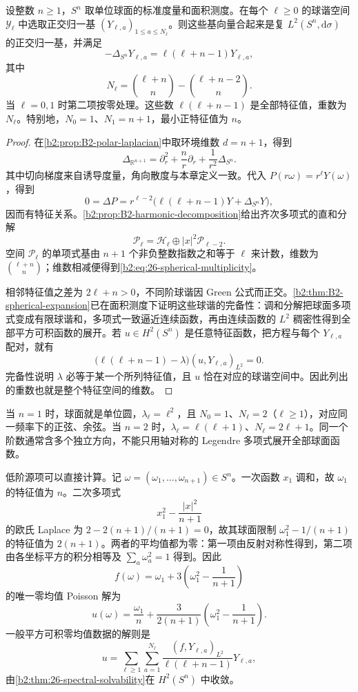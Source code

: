 \begin{proposition}[单位球面的球谐谱]\label{b2:prop:26-sphere-spectrum}
设整数 \(n\geq1\)，\(S^n\) 取单位球面的标准度量和面积测度。在每个 \(\ell\geq0\) 的球谐空间 \(\mathcal Y_\ell\) 中选取正交归一基 \((Y_{\ell,a})_{1\leq a\leq N_\ell}\)。则这些基向量合起来是复 \(L^2(S^n,\mathrm d\sigma)\) 的正交归一基，并满足
\[
 -\Delta_{S^n}Y_{\ell,a}=\ell(\ell+n-1)Y_{\ell,a},
\]
其中
\begin{equation}\label{b2:eq:26-spherical-multiplicity}
 N_\ell=\binom{\ell+n}{n}-\binom{\ell+n-2}{n}.
\end{equation}
当 \(\ell=0,1\) 时第二项按零处理。这些数 \(\ell(\ell+n-1)\) 是全部特征值，重数为 \(N_\ell\)。特别地，\(N_0=1\)、\(N_1=n+1\)，最小正特征值为 \(n\)。
\end{proposition}
\begin{proof}
在\cref{b2:prop:B2-polar-laplacian}中取环境维数 \(d=n+1\)，得到
\[
 \Delta_{\mathbb R^{n+1}}=\partial_r^2+\frac nr\partial_r+\frac1{r^2}\Delta_{S^n}.
\]
其中切向梯度来自诱导度量，角向散度与本章定义一致。代入 \(P(r\omega)=r^\ell Y(\omega)\)，得到
\[
 0=\Delta P=r^{\ell-2}\bigl(\ell(\ell+n-1)Y+\Delta_{S^n}Y\bigr),
\]
因而有特征关系。\cref{b2:prop:B2-harmonic-decomposition}给出齐次多项式的直和分解
\[
 \mathcal P_\ell=\mathcal H_\ell\oplus|x|^2\mathcal P_{\ell-2}.
\]
空间 \(\mathcal P_\ell\) 的单项式基由 \(n+1\) 个非负整数指数之和等于 \(\ell\) 来计数，维数为 \(\binom{\ell+n}{n}\)；维数相减便得到\eqref{b2:eq:26-spherical-multiplicity}。

相邻特征值之差为 \(2\ell+n>0\)，不同阶球谐因 Green 公式而正交。\cref{b2:thm:B2-spherical-expansion}已在面积测度下证明这些球谐的完备性：调和分解把球面多项式变成有限球谐和，多项式一致逼近连续函数，再由连续函数的 \(L^2\) 稠密性得到全部平方可积函数的展开。若 \(u\in H^2(S^n)\) 是任意特征函数，把方程与每个 \(Y_{\ell,a}\) 配对，就有
\[
 \bigl(\ell(\ell+n-1)-\lambda\bigr)(u,Y_{\ell,a})_{L^2}=0.
\]
完备性说明 \(\lambda\) 必等于某一个所列特征值，且 \(u\) 恰在对应的球谐空间中。因此列出的重数也就是整个特征空间的维数。
\end{proof}

当 \(n=1\) 时，球面就是单位圆，\(\lambda_\ell=\ell^2\)，且 \(N_0=1\)、\(N_\ell=2\)（\(\ell\geq1\)），对应同一频率下的正弦、余弦。当 \(n=2\) 时，\(\lambda_\ell=\ell(\ell+1)\)、\(N_\ell=2\ell+1\)。同一个阶数通常含多个独立方向，不能只用轴对称的 Legendre 多项式展开全部球面函数。

\ProseParagraphBreak

低阶源项可以直接计算。记 \(\omega=(\omega_1,\ldots,\omega_{n+1})\in S^n\)。一次函数 \(x_1\) 调和，故 \(\omega_1\) 的特征值为 \(n\)。二次多项式
\[
 x_1^2-\frac{|x|^2}{n+1}
\]
的欧氏 Laplace 为 \(2-2(n+1)/(n+1)=0\)，故其球面限制 \(\omega_1^2-1/(n+1)\) 的特征值为 \(2(n+1)\)。两者的平均值都为零：第一项由反射对称性得到，第二项由各坐标平方的积分相等及 \(\sum_a\omega_a^2=1\) 得到。因此
\[
 f(\omega)=\omega_1+3\left(\omega_1^2-\frac1{n+1}\right)
\]
的唯一零均值 Poisson 解为
\[
 u(\omega)=\frac{\omega_1}{n}
       +\frac{3}{2(n+1)}\left(\omega_1^2-\frac1{n+1}\right).
\]
一般平方可积零均值数据的解则是
\[
 u=\sum_{\ell\geq1}\sum_{a=1}^{N_\ell}
       \frac{(f,Y_{\ell,a})_{L^2}}{\ell(\ell+n-1)}Y_{\ell,a},
\]
由\cref{b2:thm:26-spectral-solvability}在 \(H^2(S^n)\) 中收敛。


